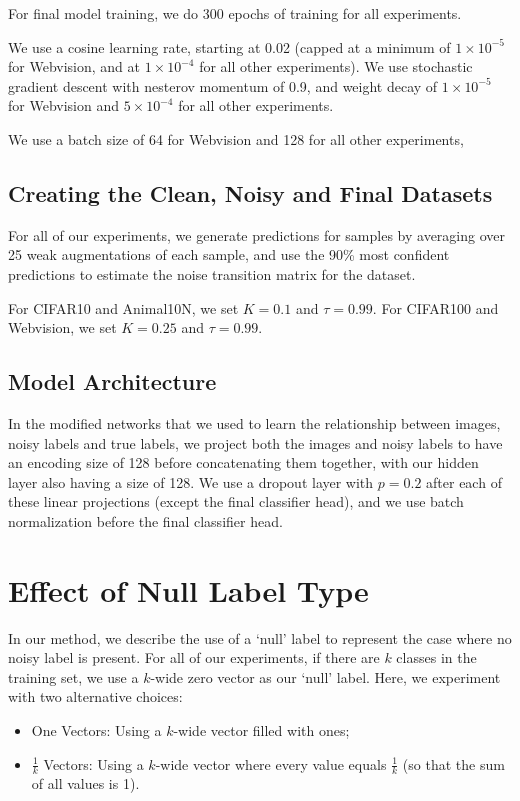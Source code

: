 \documentclass[10pt,twocolumn,letterpaper]{article}
\begin{document}
For final model training, we do 300 epochs of training for all experiments.

We use a cosine learning rate, starting at 0.02 (capped at a minimum of $1 \times 10^{-5}$ for Webvision, and at $1 \times 10^{-4}$ for all other experiments). We use stochastic gradient descent with nesterov momentum of 0.9, and weight decay of $1 \times 10^{-5}$ for Webvision and $5 \times 10^{-4}$ for all other experiments.

We use a batch size of 64 for Webvision and 128 for all other experiments,

\subsection{Creating the Clean, Noisy and Final Datasets}

For all of our experiments, we generate predictions for samples by averaging over 25 weak augmentations of each sample, and use the 90\% most confident predictions to estimate the noise transition matrix for the dataset.

For CIFAR10 and Animal10N, we set $K=0.1$ and $\tau=0.99$. For CIFAR100 and Webvision, we set $K=0.25$ and $\tau=0.99$.


\subsection{Model Architecture}

In the modified networks that we used to learn the relationship between images, noisy labels and true labels, we project both the images and noisy labels to have an encoding size of 128 before concatenating them together, with our hidden layer also having a size of 128. We use a dropout layer with $p=0.2$ after each of these linear projections (except the final classifier head), and we use batch normalization before the final classifier head. 

\section{Effect of Null Label Type}

In our method, we describe the use of a `null' label to represent the case where no noisy label is present. For all of our experiments, if there are $k$ classes in the training set, we use a $k$-wide zero vector as our `null' label. Here, we experiment with two alternative choices:

\begin{itemize}
    \item One Vectors: Using a $k$-wide vector filled with ones;
    \item $\frac{1}{k}$ Vectors: Using a $k$-wide vector where every value equals $\frac{1}{k}$ (so that the sum of all values is 1).
\end{itemize}
\end{document}

